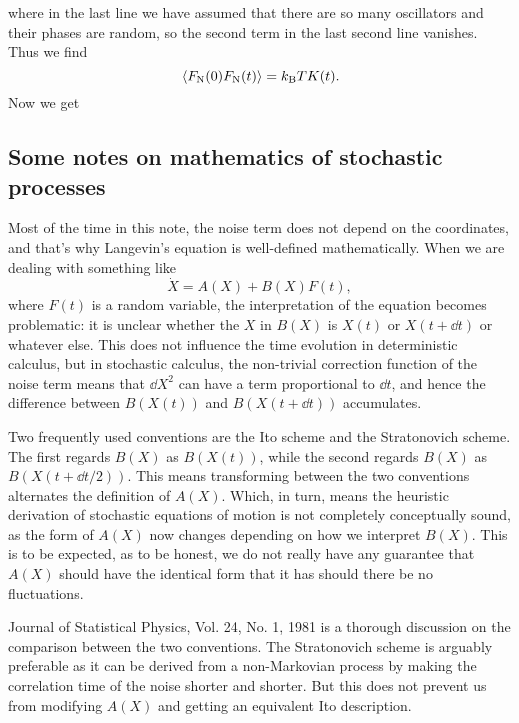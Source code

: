 \documentclass[hyperref, a4paper]{article}
\newcommand*{\kB}{k_{\text{B}}}
\newcommand{\fn}{F_{\text{N}}}
\begin{document}
where in the last line we have assumed that 
there are so many oscillators and their phases are random,
so the second term in the last second line vanishes.
Thus we find 
\begin{equation}
    \expval*{\fn(0) \fn(t)} = \kB T K(t).
\end{equation}
Now we get 

\subsection{Some notes on mathematics of stochastic processes}

Most of the time in this note,
the noise term does not depend on the coordinates,
and that's why Langevin's equation is well-defined mathematically.
When we are dealing with something like 
\begin{equation}
    \dot{X} = A(X) + B(X) F(t),
\end{equation}
where $F(t)$ is a random variable, the interpretation of the equation becomes problematic:
it is unclear whether the $X$ in $B(X)$ is $X(t)$ or $X(t + \dd{t})$ or whatever else.
This does not influence the time evolution in deterministic calculus,
but in stochastic calculus, the non-trivial correction function of the noise term means that 
$\dd{X}^2$ can have a term proportional to $\dd{t}$,
and hence the difference between $B(X(t))$ and $B(X(t + \dd{t}))$ accumulates.

Two frequently used conventions are the Ito scheme and the Stratonovich scheme.
The first regards $B(X)$ as $B(X(t))$,
while the second regards $B(X)$ as $B(X(t + \dd{t} / 2))$.
This means transforming between the two conventions alternates the definition of $A(X)$.
Which, in turn, means the heuristic derivation of stochastic equations of motion is not
completely conceptually sound,
as the form of $A(X)$ now changes depending on how we interpret $B(X)$.
This is to be expected, as to be honest,
we do not really have any guarantee that $A(X)$ should have the identical form that it has should there be no fluctuations.

Journal of Statistical Physics, Vol. 24, No. 1, 1981 is a thorough discussion 
on the comparison between the two conventions.
The Stratonovich scheme is arguably preferable as it can be derived from 
a non-Markovian process by making the correlation time of the noise shorter and shorter.
But this does not prevent us from modifying $A(X)$ and getting an equivalent Ito description.
\end{document}
